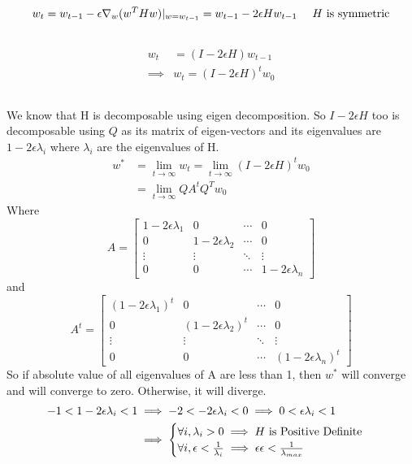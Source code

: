 \documentclass[]{article}
\numberwithin{equation}{section}
\newcommand{\transpose}{^T}
\newcommand{\at}[2][]{#1|_{#2}}
\begin{document}
\subsection{}
\begin{align}
w_t &= w_{t-1} - \epsilon \nabla_w (w\transpose H w)\at{w=w_{t-1}} = w_{t-1} - 2\epsilon H w_{t-1}\ & H \textup{ is symmetric}
\end{align}

\subsection{}
\begin{align}
w_t &= (I - 2\epsilon H) w_{t-1}\\
\implies & w_t = (I - 2\epsilon H)^t w_{0}
\end{align}

\subsection{}
We know that H is decomposable using eigen decomposition.
So \(I - 2\epsilon H\) too is decomposable using \(Q\) as its matrix of eigen-vectors and its eigenvalues are \(1 - 2\epsilon \lambda_i\) where \(\lambda_i\) are the eigenvalues of H.
\begin{align}
w^* &= \lim_{t\rightarrow \infty} w_t = \lim_{t\rightarrow \infty} (I - 2\epsilon H)^t w_{0}\\
&= \lim_{t\rightarrow \infty} Q A^t Q\transpose w_{0}
\end{align}
Where \[A = \begin{bmatrix} 1 - 2\epsilon \lambda_1 & 0 & \cdots & 0 \\ 0 & 1 - 2\epsilon \lambda_2 & \cdots & 0 \\ \vdots & \vdots & \ddots & \vdots \\ 0 & 0 & \cdots & 1 - 2\epsilon \lambda_n \end{bmatrix}\]
and \[A^t= \begin{bmatrix} (1 - 2\epsilon \lambda_1)^t & 0 & \cdots & 0 \\ 0 & (1 - 2\epsilon \lambda_2)^t & \cdots & 0 \\ \vdots & \vdots & \ddots & \vdots \\ 0 & 0 & \cdots & (1 - 2\epsilon \lambda_n)^t \end{bmatrix}\]
So if absolute value of all eigenvalues of A are less than 1, then \(w^*\) will converge and will converge to zero. Otherwise, it will diverge.
\begin{align}
-1 < 1 - 2\epsilon \lambda_i < 1 &\implies -2 < -2\epsilon \lambda_i < 0 \implies 0 < \epsilon \lambda_i < 1\\
 &\implies \begin{cases}
    \forall i, \lambda_i > 0 \implies H \textup{ is Positive Definite}\\
    \forall i, \epsilon < \frac{1}{\lambda_i} \implies \epsilon \epsilon < \frac{1}{\lambda_{max}}
 \end{cases}
\end{align}
\end{document}
